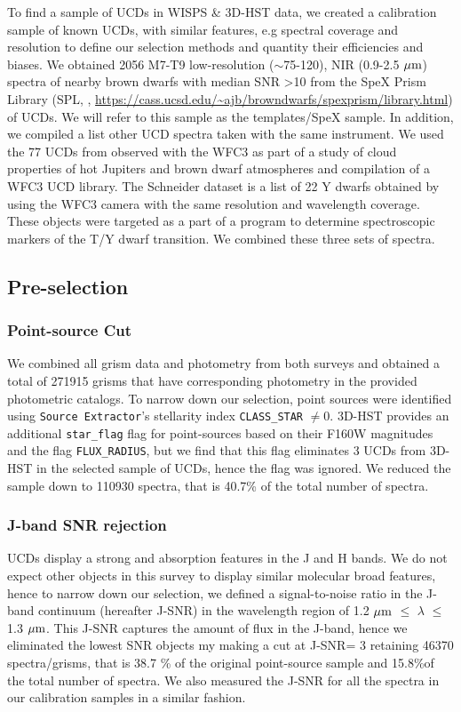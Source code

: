 \documentclass[manuscript]{aastex63}
\begin{document}
To find a sample of UCDs in WISPS \& 3D-HST data, we created a calibration sample of known UCDs, with similar features, e.g spectral coverage and resolution to define our selection methods and quantity their efficiencies and biases. We obtained 2056 M7-T9 low-resolution ($\sim$75-120), NIR (0.9-2.5 $\mbox{$\mu$m}$) spectra of nearby brown dwarfs with median SNR \textgreater 10 from the SpeX Prism Library (SPL, \citealt{2014arXiv1406.4887B}, \url{https://cass.ucsd.edu/~ajb/browndwarfs/spexprism/library.html}) of UCDs. We will refer to this sample as the templates/SpeX sample. In addition, we compiled a list other UCD spectra taken with the same instrument. We used the 77 UCDs from \cite{Manjavacas2018} observed with the WFC3 as part of a study of cloud properties of hot Jupiters and brown dwarf atmospheres and compilation of a WFC3 UCD library. The Schneider dataset is a list of 22 Y dwarfs obtained by \cite{Schneider2015} using the WFC3 camera with the same resolution and wavelength coverage. These objects were targeted as a part of a program to determine spectroscopic markers of the T/Y dwarf transition. We combined these three sets of spectra. 

\subsection{Pre-selection}

\subsubsection{Point-source Cut}

We combined all grism data and photometry from both surveys and obtained a total of 271915 grisms that have corresponding photometry in the provided photometric catalogs. To narrow down our selection, point sources were identified using \texttt{Source Extractor}'s stellarity index \texttt{CLASS\_STAR} $\neq$0. 3D-HST provides an additional \texttt{star\_flag} flag for point-sources based on their F160W magnitudes and the flag \texttt{FLUX\_RADIUS}, but we find that this flag eliminates 3 UCDs from 3D-HST in the selected sample of UCDs, hence the flag was ignored. We reduced the sample down to 110930 spectra, that is 40.7\% of the total number of spectra.


\subsubsection{J-band SNR rejection }
UCDs display a strong \wat and \meth absorption features in the J and H bands. We do not expect other objects in this survey to display similar molecular broad features, hence to narrow down our selection, we defined a signal-to-noise ratio in the J-band continuum (hereafter J-SNR) in the wavelength region of 1.2 $\mbox{$\mu$m}$ $\leq$ $\lambda$ $\leq$1.3 $\mbox{$\mu$m}$. This J-SNR captures the amount of flux in the J-band, hence we eliminated the lowest SNR objects my making a cut at J-SNR= 3 retaining 46370 spectra/grisms, that is 38.7 \% of the original point-source sample and 15.8\%of the total number of spectra. We also measured the J-SNR for all the spectra in our calibration samples in a similar fashion.
\end{document}
